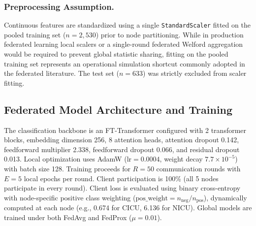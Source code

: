 \documentclass[sigconf,review,anonymous]{acmart}
\begin{document}
\subsubsection{Preprocessing Assumption.} Continuous features are standardized using a single \texttt{StandardScaler} fitted on the pooled training set ($n = 2{,}530$) prior to node partitioning. While in production federated learning local scalers or a single-round federated Welford aggregation would be required to prevent global statistic sharing, fitting on the pooled training set represents an operational simulation shortcut commonly adopted in the federated literature. The test set ($n = 633$) was strictly excluded from scaler fitting.

\subsection{Federated Model Architecture and Training}
The classification backbone is an FT-Transformer \cite{gorishniy2021revisiting} configured with 2 transformer blocks, embedding dimension 256, 8 attention heads, attention dropout 0.142, feedforward multiplier 2.338, feedforward dropout 0.066, and residual dropout 0.013. Local optimization uses AdamW ($\text{lr} = 0.0004$, weight decay $7.7\times 10^{-5}$) with batch size 128. Training proceeds for $R = 50$ communication rounds with $E = 5$ local epochs per round. Client participation is 100\% (all 5 nodes participate in every round). Client loss is evaluated using binary cross-entropy with node-specific positive class weighting ($\text{pos\_weight} = n_{\text{neg}} / n_{\text{pos}}$), dynamically computed at each node (e.g., 0.674 for CICU, 6.136 for NICU). Global models are trained under both FedAvg and FedProx ($\mu = 0.01$).
\end{document}
